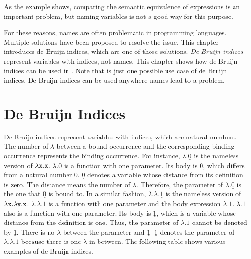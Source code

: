 As the example shows, comparing the semantic equivalence of expressions is an
important problem, but naming variables is not a good way for this purpose.

For these reasons, names are often problematic in programming languages.
Multiple solutions have been proposed to resolve the issue. This chapter introduces
de Bruijn indices, which are one of those solutions. \textit{De Bruijn indices}
 represent variables with indices, not names.
This chapter shows how de Bruijn indices can be used in \lang. Note that \lang
is just one possible use case of de Bruijn indices.
De Bruijn indices can be used anywhere names lead to a problem.

\section{De Bruijn Indices}

De Bruijn indices represent variables with indices, which are natural numbers.
The number of $\lambda$ between a bound occurrence and the corresponding binding
occurrence represents the binding occurrence. For instance,
$\lambda.\underline{0}$ is the nameless version of $\lambda \texttt{x}.\texttt{x}$.
$\lambda.\underline{0}$ is a function with one parameter. Its body is
$\underline{0}$, which differs from a natural number $0$. $\underline{0}$ denotes
a variable whose distance from its definition is zero. The distance means the
number of $\lambda$. Therefore, the parameter of $\lambda.\underline{0}$ is the
one that $\underline{0}$ is bound to. In a similar fashion,
$\lambda.\lambda.\underline{1}$ is the nameless version of $\lambda \texttt{x}
.\lambda\texttt{y}.\texttt{x}$. $\lambda.\lambda.\underline{1}$ is a function with
one parameter and the body expression $\lambda.\underline{1}$.
$\lambda.\underline{1}$ also is a function with one parameter. Its body is
$\underline{1}$, which is a variable whose distance from the definition is one.
Thus, the parameter of $\lambda.\underline{1}$ cannot be denoted by
$\underline{1}$. There is no $\lambda$ between the parameter and $\underline{1}$.
$\underline{1}$ denotes the parameter of $\lambda.\lambda.\underline{1}$ because
there is one $\lambda$ in between. The following table shows various examples of de
Bruijn indices.

